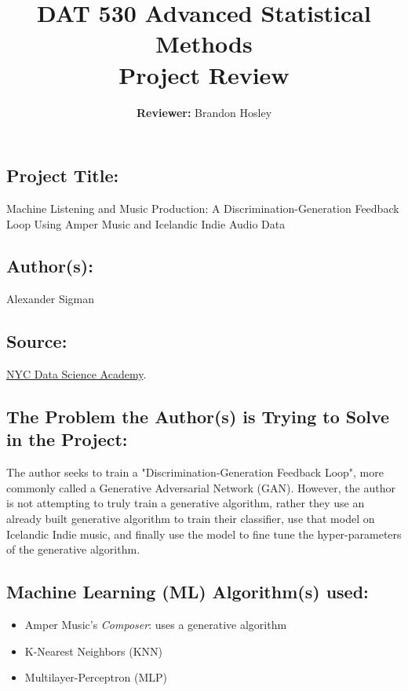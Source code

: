 \documentclass[]{article}
\title{\textbf{DAT 530 Advanced Statistical Methods}\\
	\normalsize{Project Review} }
\author{\textbf{Reviewer: }
	Brandon Hosley}
\begin{document}
\setlength{\droptitle}{-10em} 
\pretitle{\begin{flushleft}\LARGE} %
	\posttitle{\end{flushleft}}
\preauthor{\begin{flushleft}\large} %
	\postauthor{\end{flushleft}}
\predate{\begin{flushleft}\large} %
	\postdate{\end{flushleft}}
\maketitle

\vspace{-2em}

\subsection*{Project Title:}
Machine Listening and Music Production: A Discrimination-Generation Feedback Loop Using Amper Music and Icelandic Indie Audio Data

\subsection*{Author(s):}
Alexander Sigman

\subsection*{Source:}
\href{https://nycdatascience.com/blog/student-works/machine-listening-and-music-production-a-discrimination-generation-feedback-loop-using-amper-music-and-icelandic-indie-audio-data/}{NYC Data Science Academy}.

\subsection*{The Problem the Author(s) is Trying to Solve in the Project:}
The author seeks to train a "Discrimination-Generation Feedback Loop", more commonly called a Generative Adversarial Network (GAN). However, the author is not attempting to truly train a generative algorithm, rather they use an already built generative algorithm to train their classifier, use that model on Icelandic Indie music, and finally use the model to fine tune the hyper-parameters of the generative algorithm.

\subsection*{Machine Learning (ML) Algorithm(s) used:}
\begin{itemize}
	\item Amper Music's \emph{Composer}: uses a generative algorithm
	\item K-Nearest Neighbors (KNN)
	\item Multilayer-Perceptron (MLP)
\end{itemize}
\end{document}
